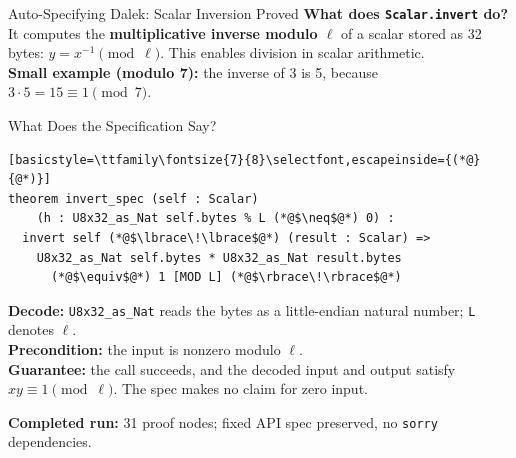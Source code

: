 \documentclass[aspectratio=169,xcolor=dvipsnames]{beamer}
\begin{document}
\begin{frame}[fragile]{Auto-Specifying Dalek: Scalar Inversion Proved}
    \footnotesize
    \textbf{What does \texttt{Scalar.invert} do?}
        It computes the \textbf{multiplicative inverse modulo $\ell$}
        of a scalar stored as 32 bytes: $y = x^{-1} \pmod{\ell}$.
        This enables division in scalar arithmetic.
        \\[3pt]
        \textbf{Small example (modulo 7):} the inverse of 3 is 5,
        because $3 \cdot 5 = 15 \equiv 1 \pmod{7}$.
    \begin{block}{What Does the Specification Say?}
\begin{lstlisting}[basicstyle=\ttfamily\fontsize{7}{8}\selectfont,escapeinside={(*@}{@*)}]
theorem invert_spec (self : Scalar)
    (h : U8x32_as_Nat self.bytes % L (*@$\neq$@*) 0) :
  invert self (*@$\lbrace\!\lbrace$@*) (result : Scalar) =>
    U8x32_as_Nat self.bytes * U8x32_as_Nat result.bytes
      (*@$\equiv$@*) 1 [MOD L] (*@$\rbrace\!\rbrace$@*)
\end{lstlisting}
        \textbf{Decode:} \texttt{U8x32\_as\_Nat} reads the bytes as a little-endian natural number;
        \texttt{L} denotes $\ell$.\\[2pt]
        \textbf{Precondition:} the input is nonzero modulo $\ell$.\\[2pt]
        \textbf{Guarantee:} the call succeeds, and the decoded input and output satisfy
        $xy \equiv 1 \pmod{\ell}$. The spec makes no claim for zero input.
    \end{block}
    \textbf{Completed run:} 31 proof nodes; fixed API spec preserved, no \texttt{sorry} dependencies.
\end{frame}
\end{document}
